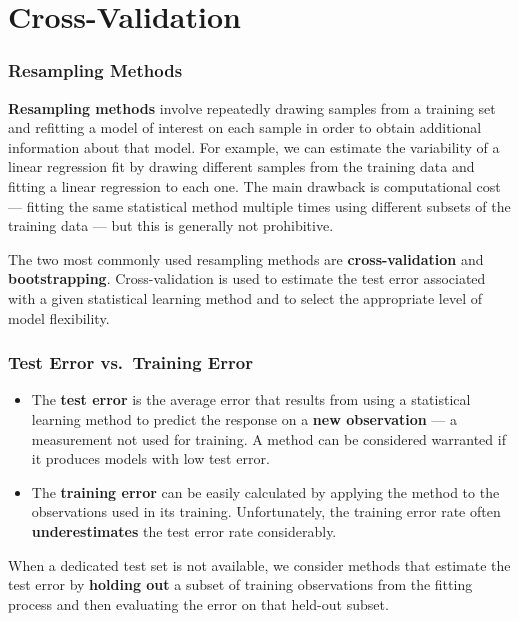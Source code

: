 \documentclass[11pt,a4paper]{article}
\theoremstyle{definition}
\theoremstyle{plain}
\theoremstyle{remark}
\begin{document}
\part{Cross-Validation}

\section{Resampling Methods}

\textbf{Resampling methods} involve repeatedly drawing samples from a training set and refitting a model of interest on each sample in order to obtain additional information about that model. For example, we can estimate the variability of a linear regression fit by drawing different samples from the training data and fitting a linear regression to each one. The main drawback is computational cost — fitting the same statistical method multiple times using different subsets of the training data — but this is generally not prohibitive.

The two most commonly used resampling methods are \textbf{cross-validation} and \textbf{bootstrapping}. Cross-validation is used to estimate the test error associated with a given statistical learning method and to select the appropriate level of model flexibility.

\section{Test Error vs.\ Training Error}

\begin{itemize}
    \item The \textbf{test error} is the average error that results from using a statistical learning method to predict the response on a \textbf{new observation} — a measurement not used for training. A method can be considered warranted if it produces models with low test error.
    \item The \textbf{training error} can be easily calculated by applying the method to the observations used in its training. Unfortunately, the training error rate often \textbf{underestimates} the test error rate considerably.
\end{itemize}

When a dedicated test set is not available, we consider methods that estimate the test error by \textbf{holding out} a subset of training observations from the fitting process and then evaluating the error on that held-out subset.
\end{document}
